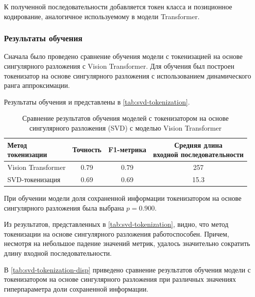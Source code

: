 К полученной последовательности добавляется токен класса и позиционное кодирование, аналогичное используемому в модели Transformer.

\subsubsection{Результаты обучения}

Сначала было проведено сравнение обучения модели с токенизацией на основе сингулярного разложения с Vision Transformer. Для обучения был построен токенизатор на основе сингулярного разложения с использованием динамического ранга аппроксимации.

Результаты обучения и представлены в \autoref{tab:svd-tokenization}.

\begin{table}[H]
  \centering
  \begin{tabular}{|l|c|c|c|}
    \hline
    \makecell{Метод \\ токенизации} 
      & {Точность} 
      & {F1-метрика} 
      & \makecell{Средняя длина \\ входной последовательности} \\ 
    \hline
    Vision Transformer & 0.79 & 0.79 & 257 \\
    SVD-токенизация & 0.69 & 0.69 & 15.3 \\ \hline
  \end{tabular}
    \caption{Сравнение результатов обучения моделей с токенизатором на основе сингулярного разложения (SVD) с моделью Vision Transformer}
  \label{tab:svd-tokenization}
\end{table}

При обучении модели доля сохраненной информации токенизатором на основе сингулярного разложения была выбрана $p = 0.900$.

Из результатов, представленных в \autoref{tab:svd-tokenization}, видно, что метод токенизации на основе сингулярного разложения работоспособен. Причем, несмотря на небольшое падение значений метрик, удалось значительно сократить длину входной последовательности.

В \autoref{tab:svd-tokenization-disp} приведено сравнение результатов обучения модели с токенизатором на основе сингулярного разложения при различных значениях гиперпараметра доли сохраненной информации.

